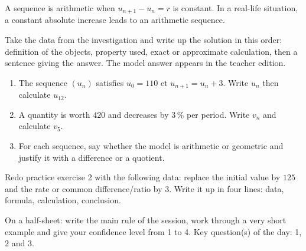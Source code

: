    \begin{traceecrite}A sequence is arithmetic when $u_{n+1}-u_n=r$ is constant. In a real-life situation, a constant absolute increase leads to an arithmetic sequence.\end{traceecrite}

    \begin{exemple}
    Take the data from the investigation and write up the solution in this order: definition of the objects, property used, exact or approximate calculation, then a sentence giving the answer. The model answer appears in the teacher edition.
    \end{exemple}

    \begin{exercice}[-- essential]
    \begin{enumerate}\item The sequence $(u_n)$ satisfies $u_0=110$ et $u_{n+1}=u_n+3$. Write $u_n$ then calculate $u_{12}$.\item A quantity is worth $420$ and decreases by $3\,\%$ per period. Write $v_n$ and calculate $v_5$.\item For each sequence, say whether the model is arithmetic or geometric and justify it with a difference or a quotient.\end{enumerate}
    \end{exercice}


    \begin{dm}Redo practice exercise 2 with the following data: replace the initial value by $125$ and the rate or common difference/ratio by $3$. Write it up in four lines: data, formula, calculation, conclusion.\end{dm}

    \begin{sortie}On a half-sheet: write the main rule of the session, work through a very short example and give your confidence level from 1 to 4. Key question(s) of the day: 1, 2 and 3.\end{sortie}

